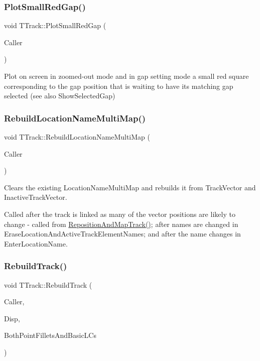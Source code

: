 \subsubsection{\texorpdfstring{Plot\+Small\+Red\+Gap()}{PlotSmallRedGap()}}
{\footnotesize\ttfamily void T\+Track\+::\+Plot\+Small\+Red\+Gap (\begin{DoxyParamCaption}\item[{int}]{Caller }\end{DoxyParamCaption})}

Plot on screen in zoomed-\/out mode and in gap setting mode a small red square corresponding to the gap position that is waiting to have its matching gap selected (see also Show\+Selected\+Gap) \mbox{\label{class_t_track_a4a948544c9ac877232ec721db8bfc914}} 
\subsubsection{\texorpdfstring{Rebuild\+Location\+Name\+Multi\+Map()}{RebuildLocationNameMultiMap()}}
{\footnotesize\ttfamily void T\+Track\+::\+Rebuild\+Location\+Name\+Multi\+Map (\begin{DoxyParamCaption}\item[{int}]{Caller }\end{DoxyParamCaption})}

Clears the existing Location\+Name\+Multi\+Map and rebuilds it from Track\+Vector and Inactive\+Track\+Vector.

Called after the track is linked as many of the vector positions are likely to change -\/ called from \mbox{\hyperlink{class_t_track_a5e2e215fae5247206220d301c324e9a0}{Reposition\+And\+Map\+Track()}}; after names are changed in Erase\+Location\+And\+Active\+Track\+Element\+Names; and after the name changes in Enter\+Location\+Name. \mbox{\label{class_t_track_afbd25aa0deb973061c8500a4509136e0}} 
\subsubsection{\texorpdfstring{Rebuild\+Track()}{RebuildTrack()}}
{\footnotesize\ttfamily void T\+Track\+::\+Rebuild\+Track (\begin{DoxyParamCaption}\item[{int}]{Caller,  }\item[{\mbox{\hyperlink{class_t_display}{T\+Display}} $\ast$}]{Disp,  }\item[{bool}]{Both\+Point\+Fillets\+And\+Basic\+L\+Cs }\end{DoxyParamCaption})}

